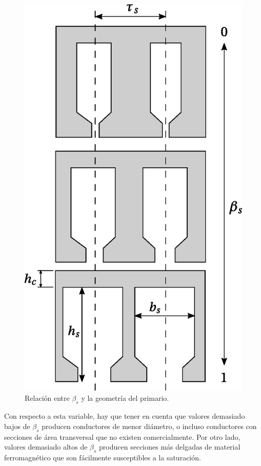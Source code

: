 \begin{figure}[t]
\centering
\includegraphics[scale=0.6]{../img/Formulacion_del_Problema_de_Optimizacion/bs2taus.eps}
\caption{Relación entre $\beta_s$ y la geometría del primario.}
\label{fig:bs2taus}
\end{figure}

Con respecto a esta variable, hay que tener en cuenta que valores demasiado bajos de $\beta_s$ producen conductores de menor diámetro, o incluso conductores con secciones de área transversal que no existen comercialmente. Por otro lado, valores demasiado altos de $\beta_s$ producen secciones más delgadas de material ferromagnético que son fácilmente susceptibles a la saturación.

